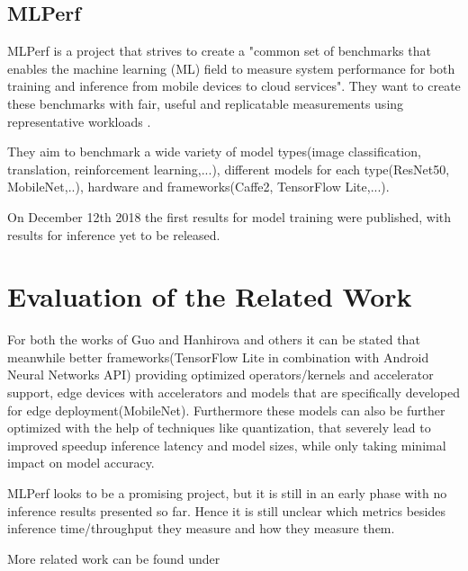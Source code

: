 \subsection{MLPerf}
MLPerf is a project that strives to create a "common set of benchmarks that enables the machine learning (ML) field to measure system performance for both training and inference from mobile devices to cloud services"\cite{mlperfWebsite}.
They want to create these benchmarks with fair, useful and replicatable measurements using representative workloads \cite{mlperf}. 

They aim to benchmark a wide variety of model types(image classification, translation, reinforcement learning,...), different models for each type(ResNet50, MobileNet,..), hardware and frameworks(Caffe2, TensorFlow Lite,...).

On December 12th 2018 the first results for model training were published, with results for inference yet to be released.
\section{Evaluation of the Related Work}
For both the works of Guo\cite{DBLP:conf/ic2e/Guo18} and Hanhirova and others\cite{DBLP:conf/mmsys/HanhirovaKSSHY18} it can be stated that meanwhile better frameworks(TensorFlow Lite in combination with Android Neural Networks API) providing optimized operators/kernels and accelerator support, edge devices with accelerators and models that are specifically developed for edge deployment(MobileNet). Furthermore these models can also be further optimized with the help of techniques like quantization, that severely lead to improved speedup inference latency and model sizes, while only taking minimal impact on model accuracy.

MLPerf looks to be a promising project, but it is still in an early phase with no inference results presented so far. Hence it is still unclear which metrics besides inference time/throughput they measure and how they measure them.

More related work can be found under \cite{DBLP:journals/corr/abs-1810-01109}
 \endinput 
